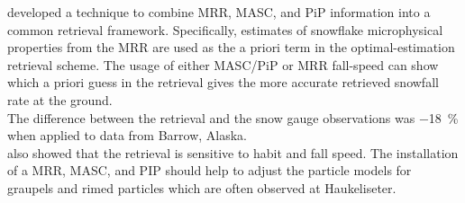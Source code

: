 \cite{cooper_variational_2017} developed a technique to combine MRR, MASC, and PiP information into a common retrieval framework. Specifically, estimates of snowflake microphysical properties from the MRR are used as the a priori term in the optimal-estimation retrieval scheme. The usage of either MASC/PiP or MRR fall-speed can show which a priori guess in the retrieval gives the more accurate retrieved snowfall rate at the ground. \\
The difference between the retrieval and the snow gauge observations was \SI{-18}{\percent} when applied to data from Barrow, Alaska.\\
\cite{cooper_variational_2017} also showed that the retrieval is sensitive to habit and fall speed. The installation of a MRR, MASC, and PIP should help to adjust the particle models for graupels and rimed particles which are often observed at Haukeliseter. 
%
\newpage

